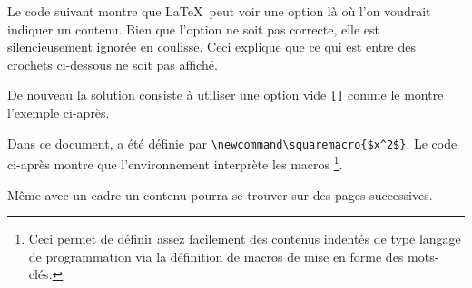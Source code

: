 \documentclass[12pt,a4paper]{article}
\begin{document}


Le code suivant montre que \LaTeX\ peut voir une option là où l'on voudrait indiquer un contenu. Bien que l'option ne soit pas correcte, elle est silencieusement ignorée en coulisse. Ceci explique que ce qui est entre des crochets ci-dessous ne soit pas affiché.



De nouveau la solution consiste à utiliser une option vide \verb#[]# comme le montre l'exemple ci-après.






Dans ce document,  a été définie par \verb#\newcommand\squaremacro{$x^2$}#.
Le code ci-après montre que l'environnement  interprète les macros
\footnote{
	Ceci permet de définir assez facilement des contenus indentés de type langage de programmation via la définition de macros de mise en forme des mots-clés.
}.

\newcommand\squaremacro{$x^2$}






Même avec un cadre un contenu pourra se trouver sur des pages successives.

\begin{figure}[hbt!]
	\centering
\end{figure}
\end{document}
